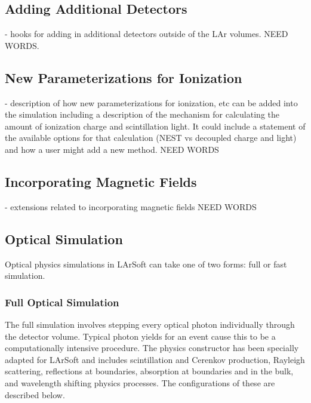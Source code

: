 \documentclass[12pt]{elsarticle}
\begin{document}
\subsection{Adding Additional Detectors}
- hooks for adding in additional detectors outside of the LAr volumes. 
NEED WORDS.
\subsection{New Parameterizations for Ionization}
- description of how new parameterizations for ionization, etc can be added into the simulation including a description of the mechanism for calculating the amount of ionization charge and scintillation light.  It could include a statement of the available options for that calculation (NEST vs decoupled charge and light) and how a user might add a new method.
NEED WORDS

\subsection{Incorporating Magnetic Fields}
- extensions related to incorporating magnetic fields
NEED WORDS
\subsection{Optical Simulation}
Optical physics simulations in LArSoft can take one of two forms: full or fast 
simulation.  
\subsubsection{Full Optical Simulation}
The full simulation involves stepping every optical photon individually through the detector volume.  Typical photon yields for an event cause this to be a computationally intensive procedure. The physics constructor has been specially adapted for LArSoft and includes scintillation and Cerenkov production, Rayleigh scattering, reflections at boundaries, absorption at boundaries and in the bulk, and wavelength shifting physics processes.  The configurations of these are described below.
\end{document}
